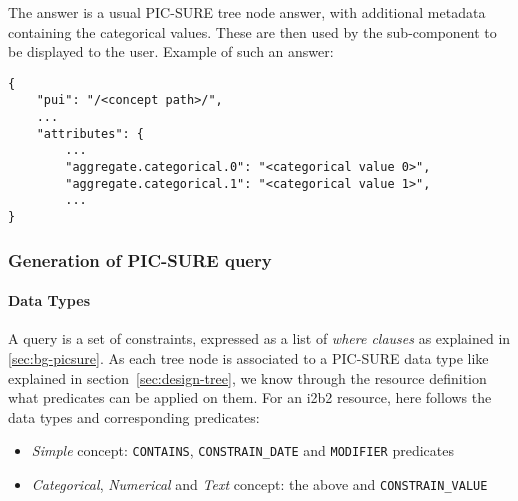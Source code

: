 The answer is a usual PIC-SURE tree node answer, with additional metadata containing the categorical values.
These are then used by the sub-component to be displayed to the user.
Example of such an answer:

\begin{samepage}
\begin{verbatim}
{
    "pui": "/<concept path>/",
    ...
    "attributes": {
        ...
        "aggregate.categorical.0": "<categorical value 0>",
        "aggregate.categorical.1": "<categorical value 1>",
        ...
}
\end{verbatim}
\end{samepage}


\subsubsection{Generation of PIC-SURE query}
\label{sec:gb-query}

\paragraph{Data Types}
A query is a set of constraints, expressed as a list of \emph{where clauses} as explained in \ref{sec:bg-picsure}.
As each tree node is associated to a PIC-SURE data type like explained in section~\ref{sec:design-tree}, we know through the resource definition what predicates can be applied on them.
For an i2b2 resource, here follows the data types and corresponding predicates:
\begin{itemize}
    \setlength\itemsep{0em}

    \item \emph{Simple} concept: \verb|CONTAINS|, \verb|CONSTRAIN_DATE| and \verb|MODIFIER| predicates
    \item \emph{Categorical}, \emph{Numerical} and \emph{Text} concept: the above and \verb|CONSTRAIN_VALUE|
\end{itemize}

